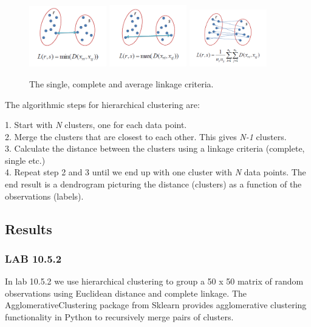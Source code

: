 \begin{figure}[H]
	\centering
	\includegraphics[width=0.3\textwidth]{clusteringMethods/hierarchicalclustering/fig/ClusteringSingle.png}
	\includegraphics[width=0.3\textwidth]{clusteringMethods/hierarchicalclustering/fig/ClusteringComplete.png}
	\includegraphics[width=0.3\textwidth]{clusteringMethods/hierarchicalclustering/fig/ClusteringAverage.png}
	\caption{The single, complete and average linkage criteria.}
	\label{fig:linkagecriteria}
\end{figure}

The algorithmic steps for hierarchical clustering are:

1. Start with \textit{N} clusters, one for each data point. \\
2. Merge the clusters that are closest to each other. This gives \textit{N-1} clusters. \\
3. Calculate the distance between the clusters using a linkage criteria (complete, single etc.) \\
4. Repeat step 2 and 3 until we end up with one cluster with \textit{N} data points. The end result is a dendrogram picturing the distance (clusters) as a function of the observations (labels).

\subsection{Results}
\subsubsection*{LAB 10.5.2}%
In lab 10.5.2 we use hierarchical clustering to group a 50 x 50 matrix of random observations using Euclidean distance and complete linkage. The AgglomerativeClustering package from Sklearn provides agglomerative clustering functionality in Python to recursively  merge pairs of clusters.

